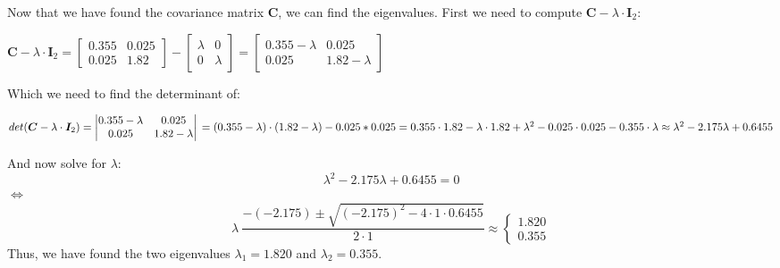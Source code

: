 \documentclass{report}
\begin{document}
Now that we have found the covariance matrix $\bm{C}$, we can find the eigenvalues. First we need to compute $\bm{C}-\lambda \cdot \bm{I}_2$:
\begin{center}
    \begin{math}
        \bm{C} - \lambda \cdot \bm{I}_2 =
        \begin{bmatrix}
            0.355 & 0.025 \\
            0.025 & 1.82
        \end{bmatrix}
        -
        \begin{bmatrix}
            \lambda & 0 \\
            0 & \lambda
        \end{bmatrix}
        =
        \begin{bmatrix}
            0.355 - \lambda & 0.025 \\
            0.025 & 1.82 - \lambda
        \end{bmatrix}
    \end{math}
\end{center}
Which we need to find the determinant of:
\begin{center}
    \begin{math}
        det(\bm{C}-\lambda \cdot \bm{I}_2) = 
        \begin{vmatrix}
            0.355 - \lambda & 0.025 \\
            0.025 & 1.82 - \lambda
        \end{vmatrix} \newline
        =
        (0.355 - \lambda) \cdot (1.82 - \lambda) - 0.025 * 0.025 \newline
        = 0.355 \cdot 1.82 - \lambda \cdot 1.82 + \lambda^2 - 0.025 \cdot 0.025 - 0.355 \cdot \lambda \newline
        \approx \lambda^2 - 2.175 \lambda + 0.6455
    \end{math}
\end{center}
And now solve for $\lambda$:
$$\lambda^2 - 2.175 \lambda + 0.6455 = 0$$
$\Leftrightarrow$
$$\lambda \ \frac{-(-2.175) \pm \sqrt{(-2.175)^2 - 4 \cdot 1 \cdot 0.6455}}{2 \cdot 1} \approx 
\begin{cases}
    1.820 \\
    0.355
\end{cases}$$
Thus, we have found the two eigenvalues $\lambda_1 = 1.820$ and $\lambda_2 = 0.355$. \\
\end{document}
